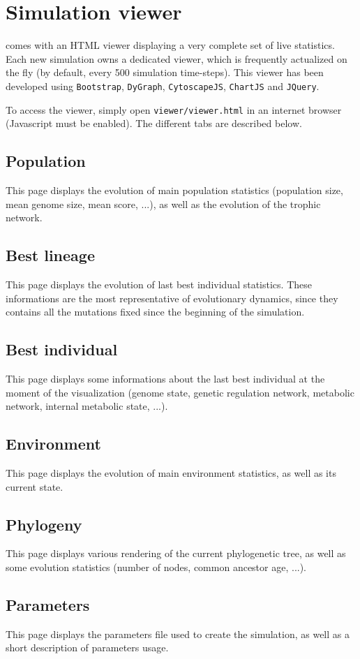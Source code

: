 \chapter{Simulation viewer}

{\packageName} comes with an HTML viewer displaying a very complete set of live statistics. Each new simulation owns a dedicated viewer, which is frequently actualized on the fly (by default, every 500 simulation time-steps). This viewer has been developed using \texttt{Bootstrap}, \texttt{DyGraph}, \texttt{CytoscapeJS}, \texttt{ChartJS} and \texttt{JQuery}.

To access the viewer, simply open \texttt{viewer/viewer.html} in an internet browser (Javascript must be enabled). The different tabs are described below.

\section{Population} 
This page displays the evolution of main population statistics (population size, mean genome size, mean score, ...), as well as the evolution of the trophic network.

\section{Best lineage}
This page displays the evolution of last best individual statistics. These informations are the most representative of evolutionary dynamics, since they contains all the mutations fixed since the beginning of the simulation.

\section{Best individual}
This page displays some informations about the last best individual at the moment of the visualization (genome state, genetic regulation network, metabolic network, internal metabolic state, ...).

\section{Environment}
This page displays the evolution of main environment statistics, as well as its current state.

\section{Phylogeny}
This page displays various rendering of the current phylogenetic tree, as well as some evolution statistics (number of nodes, common ancestor age, ...).

\section{Parameters}
This page displays the parameters file used to create the simulation, as well as a short description of parameters usage.
